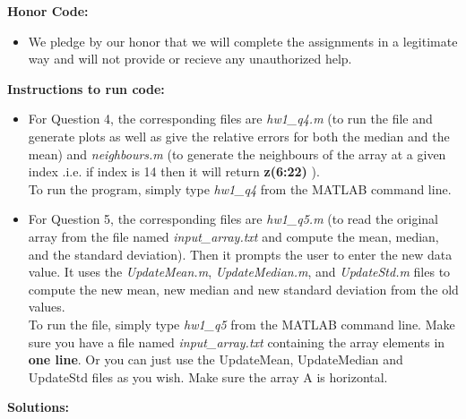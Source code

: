 \documentclass[11pt]{article}
\begin{document}
\maketitle
\newpage
{}

\textbf{Honor Code:} 
\begin{itemize}
\item We pledge by our honor that we will complete the assignments in a legitimate way and will not provide or recieve any unauthorized help. 
\end{itemize}
\vspace{5mm}
\textbf{Instructions to run code: }
\begin{itemize}
	\item {
		For Question 4, the corresponding files are \textit{hw1\_q4.m} (to run the file and generate plots as well as give the relative errors for both the median and the mean) and \textit{neighbours.m} (to generate the neighbours of the array at a given index .i.e. if index is 14 then it will return \textbf{z(6:22)} ). \\
		To run the program, simply type \textit{hw1\_q4} from the MATLAB command line.
	} 
	\item {
		For Question 5, the corresponding files are \textit{hw1\_q5.m} (to read the original array from the file named \textit{input\_array.txt} and compute the mean, median, and the standard deviation). Then it prompts the user to enter the new data value. It uses the \textit{UpdateMean.m}, \textit{UpdateMedian.m}, and \textit{UpdateStd.m} files to compute the new mean, new median and new standard deviation from the old values. \\
		To run the file, simply type \textit{hw1\_q5} from the MATLAB command line. Make sure you have a file named \textit{input\_array.txt} containing the array elements in \textbf{one line}.
		Or you can just use the UpdateMean, UpdateMedian and UpdateStd files as you wish. Make sure the array A is horizontal.
	}
\end{itemize}
\textbf{Solutions: }
\end{document}
